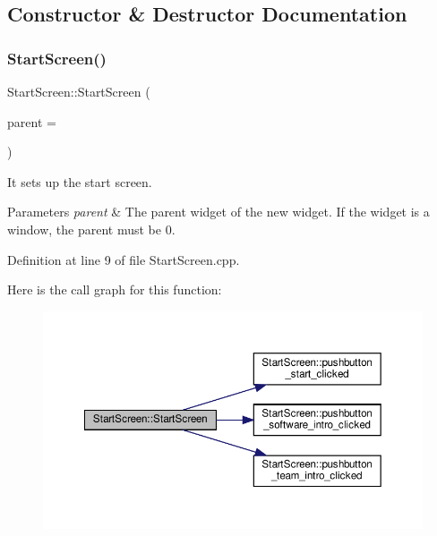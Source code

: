 \subsection{Constructor \& Destructor Documentation}
\mbox{\label{class_start_screen_a635b9676e997e79c0a5bbecc6f2103eb}} 
\subsubsection{\texorpdfstring{Start\+Screen()}{StartScreen()}}
{\footnotesize\ttfamily Start\+Screen\+::\+Start\+Screen (\begin{DoxyParamCaption}\item[{Q\+Widget $\ast$}]{parent = {} }\end{DoxyParamCaption})\hspace{0.3cm}{\ttfamily [explicit]}}

It sets up the start screen.


\begin{DoxyParams}{Parameters}
{\em parent} & The parent widget of the new widget. If the widget is a window, the parent must be 0. \\
\hline
\end{DoxyParams}


Definition at line 9 of file Start\+Screen.\+cpp.

Here is the call graph for this function\+:
\nopagebreak
\begin{figure}[H]
\begin{center}
\leavevmode
\includegraphics[width=350pt]{class_start_screen_a635b9676e997e79c0a5bbecc6f2103eb_cgraph}
\end{center}
\end{figure}
\mbox{\label{class_start_screen_afb1b54b9d5cda32ea7e9e1c5cf8b9300}} 
